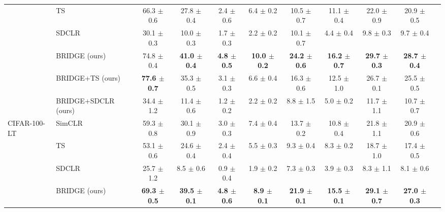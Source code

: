 \begin{table}[H]
\begin{adjustbox}{width=\textwidth}
\begin{tabular}{l l c c c c c c c c c}
 & TS & 66.3 {\scriptsize$\pm$ 0.6} & 27.8 {\scriptsize$\pm$ 0.4} & 2.4 {\scriptsize$\pm$ 0.6} & 6.4 {\scriptsize$\pm$ 0.2} & 10.5 {\scriptsize$\pm$ 0.7} & 11.1 {\scriptsize$\pm$ 0.4} & 22.0 {\scriptsize$\pm$ 0.9} & 20.9 {\scriptsize$\pm$ 0.5} \\
 & SDCLR & 30.1 {\scriptsize$\pm$ 0.3} & 10.0 {\scriptsize$\pm$ 0.3} & 1.7 {\scriptsize$\pm$ 0.3} & 2.2 {\scriptsize$\pm$ 0.2} & 10.1 {\scriptsize$\pm$ 0.7} & 4.4 {\scriptsize$\pm$ 0.4} & 9.8 {\scriptsize$\pm$ 0.3} & 9.7 {\scriptsize$\pm$ 0.4} \\
 & BRIDGE (ours) & 74.8 {\scriptsize$\pm$ 0.4} & \textbf{41.0 {\scriptsize$\pm$ 0.4}} & \textbf{4.8 {\scriptsize$\pm$ 0.5}} & \textbf{10.0 {\scriptsize$\pm$ 0.2}} & \textbf{24.2 {\scriptsize$\pm$ 0.6}} & \textbf{16.2 {\scriptsize$\pm$ 0.7}} & \textbf{29.7 {\scriptsize$\pm$ 0.3}} & \textbf{28.7 {\scriptsize$\pm$ 0.4}} \\
 & BRIDGE+TS (ours) & \textbf{77.6 {\scriptsize$\pm$ 0.7}} & 35.3 {\scriptsize$\pm$ 0.5} & 3.1 {\scriptsize$\pm$ 0.3} & 6.6 {\scriptsize$\pm$ 0.4} & 16.3 {\scriptsize$\pm$ 0.6} & 12.5 {\scriptsize$\pm$ 1.0} & 26.7 {\scriptsize$\pm$ 0.1} & 25.5 {\scriptsize$\pm$ 0.5} \\
 & BRIDGE+SDCLR (ours) & 34.4 {\scriptsize$\pm$ 1.2} & 11.4 {\scriptsize$\pm$ 0.6} & 1.2 {\scriptsize$\pm$ 0.2} & 2.2 {\scriptsize$\pm$ 0.2} & 8.8 {\scriptsize$\pm$ 1.5} & 5.0 {\scriptsize$\pm$ 0.2} & 11.7 {\scriptsize$\pm$ 1.1} & 10.7 {\scriptsize$\pm$ 0.7} \\
\midrule
CIFAR-100-LT & SimCLR & 59.3 {\scriptsize$\pm$ 0.8} & 30.1 {\scriptsize$\pm$ 0.9} & 3.0 {\scriptsize$\pm$ 0.3} & 7.4 {\scriptsize$\pm$ 0.4} & 13.7 {\scriptsize$\pm$ 0.2} & 10.8 {\scriptsize$\pm$ 0.4} & 21.8 {\scriptsize$\pm$ 1.1} & 20.9 {\scriptsize$\pm$ 0.6} \\
 & TS & 53.1 {\scriptsize$\pm$ 0.6} & 24.6 {\scriptsize$\pm$ 0.4} & 2.4 {\scriptsize$\pm$ 0.4} & 5.5 {\scriptsize$\pm$ 0.3} & 9.3 {\scriptsize$\pm$ 0.4} & 8.3 {\scriptsize$\pm$ 0.2} & 18.7 {\scriptsize$\pm$ 1.0} & 17.4 {\scriptsize$\pm$ 0.5} \\
 & SDCLR & 25.7 {\scriptsize$\pm$ 1.2} & 8.5 {\scriptsize$\pm$ 0.6} & 0.9 {\scriptsize$\pm$ 0.4} & 1.9 {\scriptsize$\pm$ 0.2} & 7.3 {\scriptsize$\pm$ 0.3} & 3.9 {\scriptsize$\pm$ 0.3} & 8.3 {\scriptsize$\pm$ 1.1} & 8.1 {\scriptsize$\pm$ 0.6} \\
 & BRIDGE (ours) & \textbf{69.3 {\scriptsize$\pm$ 0.5}} & \textbf{39.5 {\scriptsize$\pm$ 0.1}} & \textbf{4.8 {\scriptsize$\pm$ 0.6}} & \textbf{8.9 {\scriptsize$\pm$ 0.1}} & \textbf{21.9 {\scriptsize$\pm$ 0.1}} & \textbf{15.5 {\scriptsize$\pm$ 0.1}} & \textbf{29.1 {\scriptsize$\pm$ 0.7}} & \textbf{27.0 {\scriptsize$\pm$ 0.3}} \\

\end{tabular}
\end{adjustbox}
\end{table}
